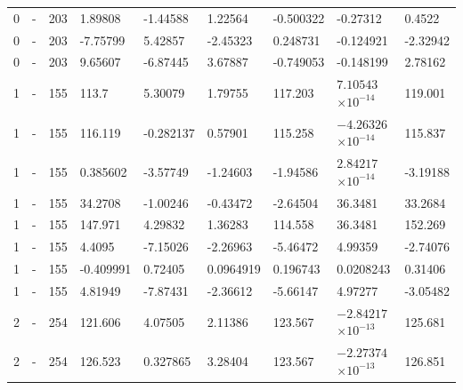 \begin{longtable}
{}0 & \allowbreak{}-\allowbreak{} & 203 & 1.89808 & -1.44588 & 1.22564 & -0.500322 & -0.27312 & 0.4522 \\
{}0 & - & 203 & -7.75799 & 5.42857 & -2.45323 & 0.248731 & -0.124921 & -2.32942 \\
{}0 & \allowbreak{}-\allowbreak{} & 203 & 9.65607 & -6.87445 & 3.67887 & -0.749053 & -0.148199 & 2.78162 \\
{}1 & \allowbreak{}-\allowbreak{} & 155 & 113.7 & 5.30079 & 1.79755 & 117.203 &  & 119.001 \\
{}1 & \allowbreak{}-\allowbreak{} & 155 & 116.119 & -0.282137 & 0.57901 & 115.258 &  & 115.837 \\
{}1 & \allowbreak{}-\allowbreak{} & 155 & 0.385602 & -3.57749 & -1.24603 & -1.94586 &  & -3.19188 \\
{}1 & \allowbreak{}-\allowbreak{} & 155 & 34.2708 & -1.00246 & -0.43472 & -2.64504 & 36.3481 & 33.2684 \\
{}1 & \allowbreak{}-\allowbreak{} & 155 & 147.971 & 4.29832 & 1.36283 & 114.558 & 36.3481 & 152.269 \\
{}1 & \allowbreak{}-\allowbreak{} & 155 & 4.4095 & -7.15026 & -2.26963 & -5.46472 & 4.99359 & -2.74076 \\
{}1 & - & 155 & -0.409991 & 0.72405 & 0.0964919 & 0.196743 & 0.0208243 & 0.31406 \\
{}1 & \allowbreak{}-\allowbreak{} & 155 & 4.81949 & -7.87431 & -2.36612 & -5.66147 & 4.97277 & -3.05482 \\
{}2 & \allowbreak{}-\allowbreak{} & 254 & 121.606 & 4.07505 & 2.11386 & 123.567 &  & 125.681 \\
{}2 & \allowbreak{}-\allowbreak{} & 254 & 126.523 & 0.327865 & 3.28404 & 123.567 &  & 126.851 \\

\end{longtable}
